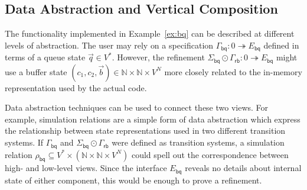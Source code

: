 \documentclass[acmsmall,screen,review,nonacm]{acmart}
\newcommand{\kw}[1]{\ensuremath{ \mathsf{#1} }}
\newcommand{\emptysig}{0}
\begin{document}




\subsection{Data Abstraction and Vertical Composition} \label{sec:sconv} %


The functionality implemented in Example~\ref{ex:bq}
can be described
at different levels of abstraction.
The user may rely on a specification
$\Gamma_\kw{bq} : \emptysig \twoheadrightarrow E_\kw{bq}$
defined in terms of a queue state $\vec{q} \in V^*$.
However,
the refinement
$\Sigma_\kw{bq} \odot \Gamma_\kw{rb} : \emptysig \twoheadrightarrow E_\kw{bq}$
might use a buffer state
$(c_1, c_2, \vec{b}) \in \mathbb{N} \times \mathbb{N} \times V^N$
more closely related to the
in-memory representation used by the actual code.

Data abstraction techniques
can be used to connect these two views.
For example, simulation relations are a simple form of data abstraction
which express the relationship between state representations used in
two different transition systems.
If $\Gamma_\kw{bq}$ and $\Sigma_\kw{bq} \odot \Gamma_\kw{rb}$
were defined as transition systems, a simulation relation
$\rho_\kw{bq} \subseteq V^* \times (\mathbb{N} \times \mathbb{N} \times V^N)$
could spell out the correspondence between
high- and low-level views.
Since the interface $E_\kw{bq}$ reveals no details about internal state
of either component,
this would be enough to prove a refinement.
\end{document}
